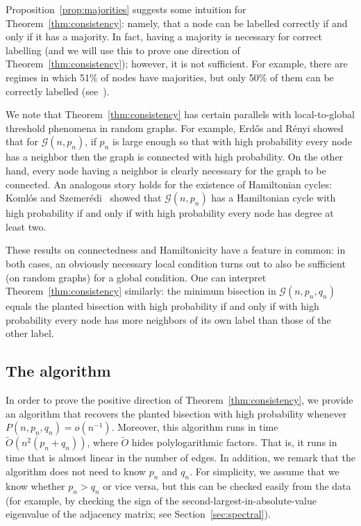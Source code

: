 \documentclass[EJP]{ejpecp}
\newcommand{\1}[1]{\mathbbm{1}_{\{#1\}}}
\newcommand{\calG}{\mathcal{G}}
\begin{document}
Proposition~\ref{prop:majorities} suggests some intuition
for Theorem~\ref{thm:consistency}: namely, that a node can be labelled
correctly if and only if it has a majority.
In fact, having a majority is necessary for correct labelling
(and we will use this to prove one direction of Theorem~\ref{thm:consistency});
however, it is not sufficient. For example, there are regimes in which
51\% of nodes have majorities, but only 50\% of them can be correctly labelled
(see~\cite{MoNeSl:13}).

We note that Theorem~\ref{thm:consistency} has certain
parallels with local-to-global threshold phenomena in random graphs. For example,
Erd\H{o}s and R\'enyi showed~\cite{ErdosRenyi:61} that for $\calG(n, p_n)$,
if $p_n$ is large enough so that with high probability every node has a neighbor
then the graph is connected with high probability. On the other hand,
every node having a neighbor is clearly necessary for the graph to be
connected. An analogous story holds for the existence of Hamiltonian cycles:
Koml\'os and Szemer\'edi~\cite{KomlosSzemeredi:83} showed that $\calG(n, p_n)$
has a Hamiltonian cycle with high probability if and only if with high probability
every node has degree at least two.

These results on connectedness and Hamiltonicity have a feature in common: in both
cases, an obviously necessary local condition turns out to also be sufficient (on
random graphs) for a global condition.
One can interpret Theorem~\ref{thm:consistency} similarly:
the minimum bisection in $\calG(n, p_n, q_n)$ equals the planted bisection with high
probability
if and only if with high probability every node
has more neighbors of its own label than those of the other label.

\subsection{The algorithm}
In order to prove the positive direction of Theorem~\ref{thm:consistency},
we provide an algorithm that recovers the planted bisection
with high probability whenever $P(n, p_n, q_n) = o(n^{-1})$.
Moreover, this algorithm runs in time $\tilde O(n^2 (p_n + q_n))$, where $\tilde O$ hides
polylogarithmic factors. That is, it runs in time that is almost linear in the number
of edges. In addition, we remark that the algorithm does not need to know $p_n$ and $q_n$.
For simplicity, we assume that we know whether $p_n > q_n$ or vice versa, but this can be checked
easily from the data (for example, by checking the sign of the second-largest-in-absolute-value
eigenvalue of the adjacency matrix; see Section~\ref{sec:spectral}).
\end{document}
